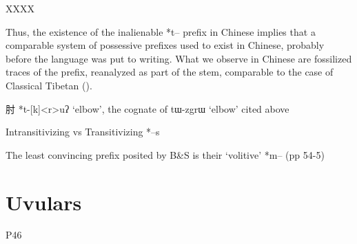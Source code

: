 \documentclass[oldfontcommands,oneside,a4paper,11pt]{article}
\newcommand{\ipa}[1]{{\phon #1}} %
\newcommand{\zh}[1]{{\cn #1}}
\begin{document}
XXXX \citet{coupe07mongsen}

Thus, the existence of the inalienable *t-- prefix in Chinese implies that a comparable system of possessive prefixes used to exist in Chinese, probably before the language was put to writing. What we observe in Chinese are fossilized traces of the prefix, reanalyzed as part of the stem, comparable to the case of Classical Tibetan (\citealt{jacques14snom}). 

\zh{肘} *\ipa{t-[k]<r>uʔ} `elbow', the cognate of \ipa{tɯ-zgrɯ} `elbow' cited above








Intransitivizing vs Transitivizing *--s
\citet{haudricourt54chinois}
 
The least convincing prefix posited by B\&S is their `volitive' *m-- (pp 54-5)

\section{Uvulars}
\citet{schuessler09minimal}
\citet{bs09reconstr}
P46
\citet{authier08budugh}



\end{document}
